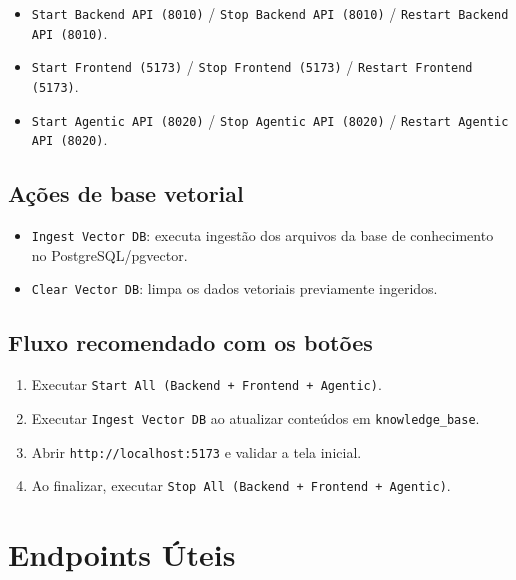 \documentclass[12pt,a4paper]{article}
\begin{document}
\begin{itemize}
  \item \texttt{Start Backend API (8010)} / \texttt{Stop Backend API (8010)} / \texttt{Restart Backend API (8010)}.
  \item \texttt{Start Frontend (5173)} / \texttt{Stop Frontend (5173)} / \texttt{Restart Frontend (5173)}.
  \item \texttt{Start Agentic API (8020)} / \texttt{Stop Agentic API (8020)} / \texttt{Restart Agentic API (8020)}.
\end{itemize}

\subsection{Ações de base vetorial}

\begin{itemize}
  \item \texttt{Ingest Vector DB}: executa ingestão dos arquivos da base de conhecimento no PostgreSQL/pgvector.
  \item \texttt{Clear Vector DB}: limpa os dados vetoriais previamente ingeridos.
\end{itemize}

\subsection{Fluxo recomendado com os botões}

\begin{enumerate}
  \item Executar \texttt{Start All (Backend + Frontend + Agentic)}.
  \item Executar \texttt{Ingest Vector DB} ao atualizar conteúdos em \texttt{knowledge\_base}.
  \item Abrir \texttt{http://localhost:5173} e validar a tela inicial.
  \item Ao finalizar, executar \texttt{Stop All (Backend + Frontend + Agentic)}.
\end{enumerate}

\section{Endpoints Úteis}
\end{document}
